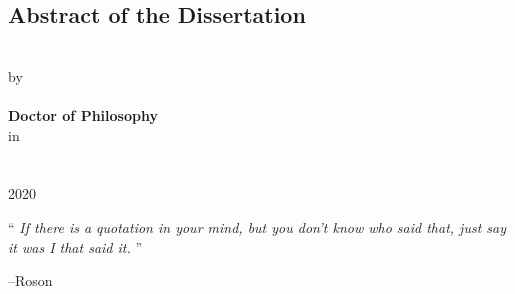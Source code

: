 \documentclass[
12pt, %
oneside, %
english, %
doublespacing, %
liststotoc, %
]{main} %
\begin{document}
\begin{singlespace}
\renewcommand{\abstractname}{Abstract of the Dissertation}
\begin{center}
	\section*{\abstractname}

		\textbf{\ttitle} \\ [0.5cm]
		by  \\ [0.5cm]
		\textbf{\authorname} \\ [0.5cm]
		\textbf{Doctor of Philosophy} \\ [0.5cm]
		in \\ [0.5cm]
		\textbf{\deptname}  \\ [0.5cm]
		\univname  \\ [0.5cm]
		2020  \\ [0.5cm]
\end{center}


\end{singlespace}
\newpage



\vspace*{0.2\textheight}

\noindent\enquote{\itshape 
If there is a quotation in your mind, but you don't know who said that, just say it was I that said it.
}\bigbreak

\hfill --Roson


\tableofcontents %

\listoffigures %

\listoftables %

\end{document}
